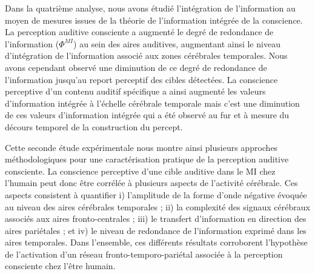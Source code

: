 Dans la quatrième analyse, nous avons étudié l'intégration de l'information au moyen de mesures issues de la théorie de l'information intégrée de la conscience. 
La perception auditive consciente a augmenté le degré de redondance de l'information ($\Phi^{MI}$) au sein des aires auditives, augmentant ainsi le niveau d'intégration de l'information associé aux zones cérébrales temporales. 
Nous avons cependant observé une diminution de ce degré de redondance de l'information jusqu'au report perceptif des cibles détectées. 
La conscience perceptive d'un contenu auditif spécifique a ainsi augmenté les valeurs d'information intégrée à l'échelle cérébrale temporale mais c'est une diminution de ces valeurs d'information intégrée qui a été observé au fur et à mesure du décours temporel de la construction du percept. 

Cette seconde étude expérimentale nous montre ainsi plusieurs approches méthodologiques pour une caractérisation pratique de la perception auditive consciente. 
La conscience perceptive d'une cible auditive dans le MI chez l'humain peut donc être corrélée à plusieurs aspects de l'activité cérébrale. 
Ces aspects consistent à quantifier i) l'amplitude de la forme d'onde négative évoquée au niveau des aires cérébrales temporales ; ii) la complexité des signaux cérébraux associés aux aires fronto-centrales ; iii) le transfert d'information en direction des aires pariétales ; et iv) le niveau de redondance de l'information exprimé dans les aires temporales.  
Dans l'ensemble, ces différents résultats corroborent l'hypothèse de l'activation d'un réseau fronto-temporo-pariétal associée à la perception consciente chez l'être humain. 

\clearpage\null\newpage
